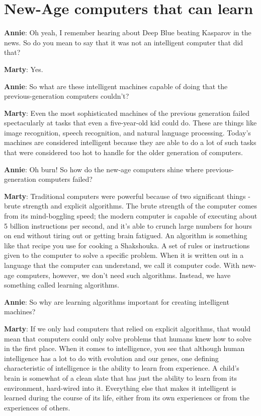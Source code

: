 \documentclass{../template/texnote}
\begin{document}
\section{New-Age computers that can learn}
\noindent

\textbf{Annie}: Oh yeah, I remember hearing about Deep Blue beating Kasparov in the news. So do you mean to say that it was not an intelligent computer that did that?

\textbf{Marty}: Yes.

\textbf{Annie}: So what are these intelligent machines capable of doing that the previous-generation computers couldn't?

\textbf{Marty}: Even the most sophisticated machines of the previous generation failed spectacularly at tasks that even a five-year-old kid could do. These are things like image recognition, speech recognition, and natural language processing. Today's machines are considered intelligent because they are able to do a lot of such tasks that were considered too hot to handle for the older generation of computers. 

\textbf{Annie}: Oh burn! So how do the new-age computers shine where previous-generation computers failed?

\textbf{Marty}: Traditional computers were powerful because of two significant things - brute strength and explicit algorithms.
The brute strength of the computer comes from its mind-boggling speed;  the modern computer is capable of executing about 5 billion instructions per second, and it's able to crunch large numbers for hours on end without tiring out or getting brain fatigued. An algorithm is something like that recipe you use for cooking a Shakshouka. A set of rules or instructions given to the computer to solve a specific problem. When it is written out in a language that the computer can understand, we call it computer code. With new-age computers, however, we don't need such algorithms. Instead, we have something called learning algorithms. 

\textbf{Annie}: So why are learning algorithms important for creating intelligent machines?

\textbf{Marty}: If we only had computers that relied on explicit algorithms, that would mean that computers could only solve problems that humans knew how to solve in the first place. When it comes to intelligence, you see that although human intelligence has a lot to do with evolution and our genes, one defining characteristic of intelligence is the ability to learn from experience. A child's brain is somewhat of a clean slate that has just the ability to learn from its environment, hard-wired into it. Everything else that makes it intelligent is learned during the course of its life, either from its own experiences or from the experiences of others. 
\end{document}
